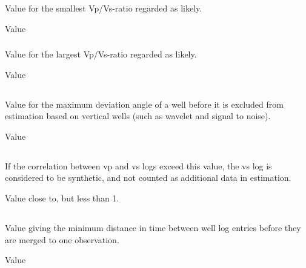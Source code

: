 \subsubsection{}
 \slist
   \item \Description Value for the smallest Vp/Vs-ratio regarded as likely.
   \item \Argument Value
   \item {}
 \elist

\subsubsection{}
 \slist
   \item \Description Value for the largest Vp/Vs-ratio regarded as likely.
   \item \Argument Value
   \item {}
 \elist

\subsection{}
 \slist
   \item \Description Value for the maximum deviation angle of a well before it is excluded from estimation based on vertical wells (such as wavelet and signal to noise).
   \item \Argument Value
   \item {}
 \elist

\subsection{}
 \slist
   \item \Description If the correlation between vp and vs logs exceed this value, the vs log is considered to be synthetic, and not counted as additional data in estimation.
   \item \Argument Value close to, but less than 1.
   \item {}
 \elist

\subsection{}
 \slist
   \item \Description Value giving the minimum distance in time between well log entries before they are merged to one observation.
   \item \Argument Value
   \item {}
 \elist


